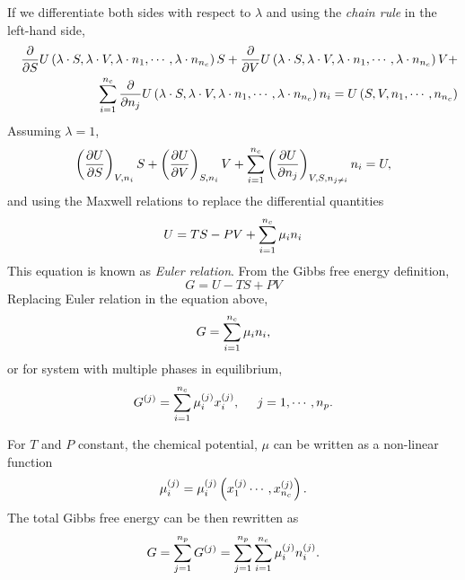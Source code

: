If we differentiate both sides with respect to $\lambda$ and using the {\it chain rule} in the left-hand side,
\begin{eqnarray}
  &&\frc{\partial}{\partial S} U\left(\lambda\cdot S, \lambda\cdot V,  \lambda\cdot n_{1}, \cdots, \lambda\cdot n_{n_{c}}\right)S + \frc{\partial}{\partial V} U\left(\lambda\cdot S, \lambda\cdot V,  \lambda\cdot n_{1}, \cdots, \lambda\cdot n_{n_{c}}\right)V + \nonumber \\
 && \hfill \summation_{i=1}^{n_{c}} \frc{\partial}{\partial n_{j}} U\left(\lambda\cdot S, \lambda\cdot V,  \lambda\cdot n_{1}, \cdots, \lambda\cdot n_{n_{c}}\right)n_{i} = U\left(S, V, n_{1}, \cdots, n_{n_{c}}\right) \nonumber 
\end{eqnarray}
Assuming $\lambda=1$,
\begin{displaymath}
   \Partial[U]{S}{V,n_{i}}S + \Partial[U]{V}{S,n_{i}}V + \summation_{i=1}^{n_{c}}\Partial[U]{n_{j}}{V,S,n_{j\ne i}}n_{i} = U,
\end{displaymath}
and using the Maxwell relations to replace the differential quantities
\begin{equation}
   U = TS - PV + \summation_{i=1}^{n_{c}} \mu_{i}n_{i}\label{Chapter:ThermodynamicFormulation:Eqn:EulerRelation}
\end{equation}
This equation is known as {\it Euler relation}.  From the Gibbs free energy definition,
\begin{displaymath}
   G = U-TS+PV
\end{displaymath}
Replacing Euler relation in the equation above,
\begin{equation}
   G = \summation_{i=1}^{n_{c}} \mu_{i}n_{i},
\end{equation}
or for system with multiple phases in equilibrium,
\begin{equation}
   \mfr[G]{}{j} = \summation_{i=1}^{n_{c}}\mfr[\mu]{i}{j}\mfr[x]{i}{j},\;\;\;\;\; j=1, \cdots, n_{p}.
\end{equation}

For $T$ and $P$ constant, the chemical potential, $\mu$ can be written as a non-linear function
\begin{equation}
   \mfr[\mu]{i}{j} = \mfr[\mu]{i}{j}\left(\mfr[x]{1}{j} \cdots, \mfr[x]{n_{c}}{j}\right).\label{Chapter:ThermodynamicFormulation:Eqn:ChemPotDef2}
\end{equation}
The total Gibbs free energy can be then rewritten as
\begin{equation}
   G = \summation_{j=1}^{n_{p}} \mfr[G]{}{j} = \summation_{j=1}^{n_{p}}\summation_{i=1}^{n_{c}} \mfr[\mu]{i}{j}\mfr[n]{i}{j}.\label{Chapter:ThermodynamicFormulation:Eqn:GibbsTotal}
 \end{equation}

